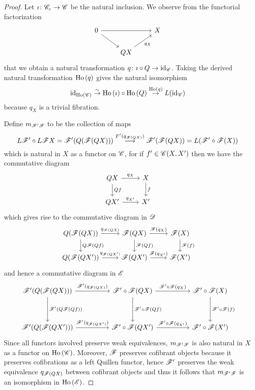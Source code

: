 \documentclass[10pt]{amsart}
\begin{document}
\begin{thm}
  \begin{proof}
    Let $\imath \colon \mathscr{C}_c \to \mathscr{C}$ be the natural inclusion.
    We observe from the functorial factorization
    $$\begin{tikzcd}
      0 \arrow{rr}\arrow{rd}&  & X\\
      & QX \arrow[swap]{ur}{q_X}
    \end{tikzcd}$$
    that we obtain a natural transformation $q \colon \imath \circ Q \to \operatorname{id}_{\mathscr{C}}$.
    Taking the derived natural transformation $\operatorname{Ho}\left(q\right)$ gives the natural isomorphism 
    $$\operatorname{id}_{\operatorname{Ho}\left(\mathscr{C}\right)} \overset{\sim}\to \operatorname{Ho}\left(\imath\right) \circ \operatorname{Ho}\left(Q\right) \overset{\operatorname{Ho}\left(q\right)}\to L(\operatorname{id}_{\mathscr{C}})$$
    because $q_X$ is a trivial fibration.
    
    Define $m_{\mathscr{F}^\prime\mathscr{F}}$ to be the collection of maps
    $$L\mathscr{F}^\prime \circ L\mathscr{F} X = \mathscr{F}^\prime(Q(\mathscr{F}(QX))) \overset{F^\prime(q_{\mathscr{F}(QX)})}\longrightarrow \mathscr{F}^\prime(\mathscr{F}(QX)) = L(\mathscr{F}^\prime \circ \mathscr{F}(X))$$
    which is natural in $X$ as a functor on $\mathscr{C}$, for if $f^\prime \in \mathscr{C}(X, X^\prime)$ then we have the commutative diagram
    $$\begin{tikzcd}
      QX \arrow{r}{q_X}\arrow{d}{Qf} & X\arrow{d}{f}\\
      QX^\prime \arrow{r}{q_{X^\prime}} & X^\prime
    \end{tikzcd}$$
    which gives rise to the commutative diagram in $\mathscr{D}$
    $$\begin{tikzcd}
      Q(\F(QX)) \arrow{r}{q_{\F(QX)}}\arrow{d}{Q\F(Qf)} & \F(QX) \arrow{r}{\F(q_X)}\arrow{d}{\F(Qf)} & \F(X)\arrow{d}{\F(f)}\\
      Q(\F(QX^\prime))\arrow{r}{q_{\F(QX^\prime)}} & \F(QX^\prime) \arrow{r}{\F(q_{X^\prime})} & \F(X^\prime)
    \end{tikzcd}$$
    and hence a commutative diagram in $\mathscr{E}$
    $$\begin{tikzcd}
      \F^\prime(Q(\F(QX))) \arrow{rr}{\F^\prime(q_{\F(QX)})}\arrow{dd}{\F^\prime(Q\F(Qf))} && \F^\prime \circ \F(QX) \arrow{rr}{\F^\prime \circ \F(q_X)}\arrow{dd}{\F^\prime \circ \F(Qf)} && \F^\prime \circ \F(X)\arrow{dd}{\F^\prime \circ \F(f)}\\
      \\
      \F^\prime(Q(\F(QX^\prime)))\arrow{rr}{\F^\prime(q_{\F(QX^\prime)})} && \F^\prime \circ \F(QX^\prime) \arrow{rr}{\F^\prime \circ \F(q_{X^\prime})} && \F^\prime \circ \F(X^\prime)
    \end{tikzcd}$$
    Since all functors involved preserve weak equivalences, $m_{\mathscr{F}^\prime\mathscr{F}}$ is also natural in $X$ as a functor on $\operatorname{Ho}\left(\mathscr{C}\right)$.
    Moreover, $\mathscr{F}$ preserves cofibrant objects because it preserves cofibrations as a left Quillen functor, hence $\mathscr{F}^\prime$ preserves the weak equivalence $q_{\mathscr{F}(QX)}$ between cofibrant objects and thus it follows that $m_{\mathscr{F}^\prime\mathscr{F}}$ is an isomorphism in $\operatorname{Ho}\left(\mathscr{E}\right)$.


\end{proof}
\end{thm}
\end{document}
